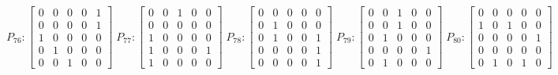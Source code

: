     $$
        P_{76} : \begin{bmatrix}
            0 & 0 & 0 & 0 & 1 \\
            0 & 0 & 0 & 0 & 1 \\
            1 & 0 & 0 & 0 & 0 \\
            0 & 1 & 0 & 0 & 0 \\
            0 & 0 & 1 & 0 & 0
        \end{bmatrix}
        \;
         P_{77} : \begin{bmatrix}
            0 & 0 & 1 & 0 & 0 \\
            0 & 0 & 0 & 0 & 0 \\
            1 & 0 & 0 & 0 & 0 \\
            1 & 0 & 0 & 0 & 1 \\
            1 & 0 & 0 & 0 & 0
        \end{bmatrix}
        \;
        P_{78} : \begin{bmatrix}
            0 & 0 & 0 & 0 & 0 \\
            0 & 1 & 0 & 0 & 0 \\
            0 & 1 & 0 & 0 & 1 \\
            0 & 0 & 0 & 0 & 1 \\
            0 & 0 & 0 & 0 & 1
        \end{bmatrix}
        \;
        P_{79} : \begin{bmatrix}
            0 & 0 & 1 & 0 & 0 \\
            0 & 0 & 1 & 0 & 0 \\
            0 & 1 & 0 & 0 & 0 \\
            0 & 0 & 0 & 0 & 1 \\
            0 & 1 & 0 & 0 & 0
        \end{bmatrix}
        \;
        P_{80} : \begin{bmatrix}
            0 & 0 & 0 & 0 & 0 \\
            1 & 0 & 1 & 0 & 0 \\
            0 & 0 & 0 & 0 & 1 \\
            0 & 0 & 0 & 0 & 0 \\
            0 & 1 & 0 & 1 & 0
        \end{bmatrix}
    $$

